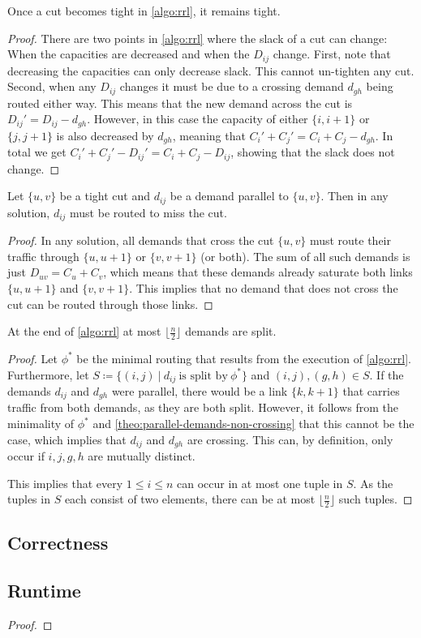 \begin{lemma}
	Once a cut becomes tight in \cref{algo:rrl}, it remains tight.
\end{lemma}
\begin{proof}
	There are two points in \cref{algo:rrl} where the slack of a cut can change:
	When the capacities are decreased and when the $D_{ij}$ change.
	First, note that decreasing the capacities can only decrease slack.
	This cannot un-tighten any cut.
	Second, when any $D_{ij}$ changes it must be due to a crossing demand $d_{gh}$ being routed either way.
	This means that the new demand across the cut is $D_{ij}' = D_{ij} - d_{gh}$.
	However, in this case the capacity of either $\{i, i+1\}$ or $\{j, j+1\}$ is also decreased by $d_{gh}$, meaning that
	$C_i' + C_j' = C_i + C_j - d_{gh}$.
	In total we get $C_i' + C_j' - D_{ij}' = C_i + C_j - D_{ij}$, showing that the slack does not change.
\end{proof}

\begin{lemma}
	Let $\{u, v\}$ be a tight cut and $d_{ij}$ be a demand parallel to $\{u, v\}$.
	Then in any solution, $d_{ij}$ must be routed to miss the cut.
\end{lemma}
\begin{proof}
	In any solution, all demands that cross the cut $\{u, v\}$ must route their traffic through $\{u, u+1\}$ or $\{v, v+1\}$ (or both).
	The sum of all such demands is just $D_{uv} = C_u + C_v$, which means that these demands already saturate both links $\{u, u+1\}$ and $\{v, v+1\}$.
	This implies that no demand that does not cross the cut can be routed through those links. 
\end{proof}

\begin{lemma}
	\label{lemma:number-of-split-demands}
	At the end of \cref{algo:rrl} at most $\lfloor\frac{n}{2}\rfloor$ demands are split.
\end{lemma}
\begin{proof}
	Let $\phi^\ast$ be the minimal routing that results from the execution of \cref{algo:rrl}.
	Furthermore, let $S \coloneqq \{(i, j)\ |\ d_{ij}\ \text{is split by}\ \phi^\ast \}$ and $(i, j), (g, h) \in S$.
	If the demands $d_{ij}$ and $d_{gh}$ were parallel, there would be a link $\{k, k+1\}$ that carries traffic from both demands, as they are both split.
	However, it follows from the minimality of $\phi^\ast$ and \cref{theo:parallel-demands-non-crossing} that this cannot be the case, which implies that $d_{ij}$ and $d_{gh}$ are crossing.
	This can, by definition, only occur if $i, j, g, h$ are mutually distinct.
	
	This implies that every $1 \leq i \leq n$ can occur in at most one tuple in $S$.
	As the tuples in $S$ each consist of two elements, there can be at most $\lfloor\frac{n}{2}\rfloor$ such tuples.
\end{proof}

\subsection{Correctness}

\subsection{Runtime}


\begin{proof}
\end{proof}
